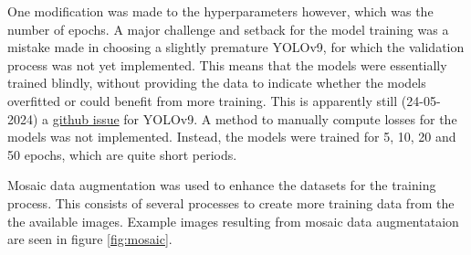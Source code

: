 One modification was made to the hyperparameters however, which was the number of epochs. A major challenge and setback for the model training was a mistake made in choosing a slightly premature YOLOv9, for which the validation process was not yet implemented. This means that the models were essentially trained blindly, without providing the data to indicate whether the models overfitted or could benefit from more training. This is apparently still (24-05-2024) a \href{https://github.com/WongKinYiu/yolov9/issues/132}{github issue} for YOLOv9. A method to manually compute losses for the models was not implemented. Instead, the models were trained for 5, 10, 20 and 50 epochs, which are quite short periods.

Mosaic data augmentation was used to enhance the datasets for the training process. This consists of several processes to create more training data from the the available images. Example images resulting from mosaic data augmentataion are seen in figure \ref{fig:mosaic}.

